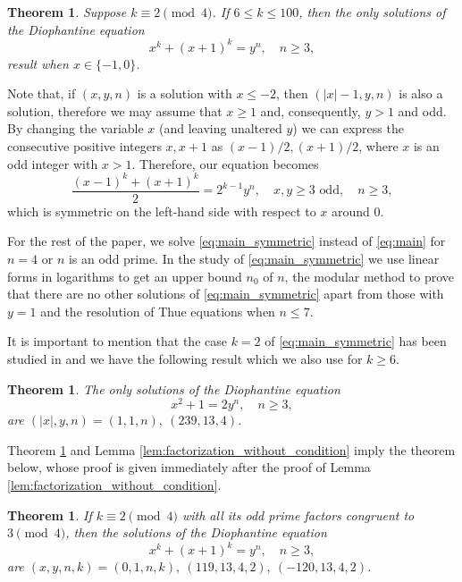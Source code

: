 \documentclass[12pt]{amsart}
\numberwithin{equation}{section}
\newtheorem{theorem}[lemma]{Theorem}
\theoremstyle{definition}
\theoremstyle{remark}
\begin{document}
\begin{theorem}\label{thm:main}
Suppose $k\equiv 2\pmod{4}$. If $6\leq k\leq 100$, then the only 
solutions of the Diophantine equation
\begin{equation} \label{eq:initial}
    x^k + (x+1)^k = y^n, \quad n\geq 3,
\end{equation}
result when $x\in\{-1,0\}$.
\end{theorem}
%
Note that, if $(x,y,n)$ is a solution with $x\le -2$, then 
$(|x|-1,y,n)$ is also a solution, therefore we may assume that
$x\ge 1$ and, consequently, $y>1$ and odd.
By changing the variable $x$ (and leaving unaltered $y$) we can express the consecutive positive integers 
$x,x+1$ as $(x-1)/2, (x+1)/2$, where $x$ is an odd integer with $x > 1$. Therefore, our equation becomes
\begin{equation}\label{eq:main_symmetric}
   \frac{(x-1)^k + (x+1)^k}{2} = 2^{k-1}y^n, \quad 
   x,y\ge 3\text{ odd},\quad n\ge 3,
\end{equation}
which is symmetric on the left-hand side with respect to $x$ around $0$. 

For the rest of the paper, we solve \eqref{eq:main_symmetric} instead of \eqref{eq:main} for $n=4$ or $n$ is an odd prime. In the study of \eqref{eq:main_symmetric} we use linear forms in logarithms to get an upper bound $n_0$ of $n$, the modular method to prove that there are no other solutions of \eqref{eq:main_symmetric} apart from those with $y=1$ and the resolution of Thue equations when $n\leq 7$.

It is important to mention that the case $k=2$ of \eqref{eq:main_symmetric} has been studied in \cite{Cohn96, MuriefahLucaSiksekTengely09} and we have the following result which we also use for $k\geq 6$.
%
\begin{theorem}\label{thm:main_k2}
The only solutions of the Diophantine equation
\begin{equation}\label{eq:main_k2}
    x^2 + 1 = 2y^n,\quad n\geq 3,
\end{equation}
are $(|x|, y, n)=(1, 1, n),~(239, 13, 4)$.
\end{theorem}

Theorem \ref{thm:main_k2} and 
Lemma \ref{lem:factorization_without_condition} imply the 
theorem below, whose proof is given immediately after the proof of
Lemma \ref{lem:factorization_without_condition}.
%
\begin{theorem}\label{thm:main_infinite_family}
If $k\equiv 2\pmod{4}$ with all its odd prime factors  
congruent to $3\pmod{4}$, then the solutions of the  Diophantine 
equation
\begin{equation}\label{eq:main_infinite_family}
    x^k + (x+1)^k = y^n, \quad n\geq 3, 
\end{equation}
 are $(x, y, n, k) = (0, 1, n, k),~(119, 13, 4, 2),~(-120, 13, 4, 2)$.
\end{theorem}
\end{document}
